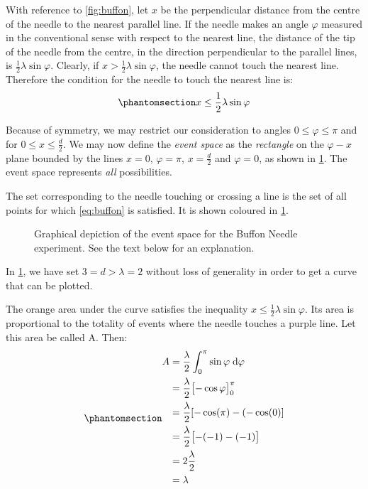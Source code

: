 \documentclass[
  a4paper,
]{article}
\begin{document}
With reference to \cref{fig:buffon}, let \(x\) be the perpendicular
distance from the centre of the needle to the nearest parallel line. If
the needle makes an angle \(\varphi\) measured in the conventional sense
with respect to the nearest line, the distance of the tip of the needle
from the centre, in the direction perpendicular to the parallel lines,
is \(\frac{1}{2}\lambda\sin\varphi\). Clearly, if
\(x > \frac{1}{2}\lambda\sin\varphi\), the needle cannot touch the
nearest line. Therefore the condition for the needle to touch the
nearest line is: \begin{equation}\phantomsection\label{eq:buffon}{
x \leq \frac{1}{2}\lambda\sin\varphi
}\end{equation}

Because of symmetry, we may restrict our consideration to angles
\(0 \leq \varphi \leq \pi\) and for \(0 \leq x \leq \frac{d}{2}\). We
may now define the \emph{event space} as the \emph{rectangle} on the
\(\varphi-x\) plane bounded by the lines \(x=0\), \(\varphi = \pi\),
\(x = \frac{d}{2}\) and \(\varphi = 0\), as shown in \cref{fig:plot}.
The event space represents \emph{all} possibilities.

The set corresponding to the needle touching or crossing a line is the
set of all points for which \cref{eq:buffon} is satisfied. It is shown
coloured in \cref{fig:plot}.

\begin{figure}
\centering

\caption{Graphical depiction of the event space for the Buffon Needle
experiment. See the text below for an explanation.}\label{fig:plot}
\end{figure}

In \cref{fig:plot}, we have set \(3 = d > \lambda = 2\) without loss of
generality in order to get a curve that can be plotted.

The orange area under the curve satisfies the inequality
\(x \leq \frac{1}{2}\lambda\sin\varphi\). Its area is proportional to
the totality of events where the needle touches a purple line. Let this
area be called A. Then:
\begin{equation}\phantomsection\label{eq:successes}{
\begin{aligned}
A &= \frac{\lambda}{2}\int_0^{\pi}\sin\varphi\;\mathrm{d}\varphi\\
&= \frac{\lambda}{2}\displaystyle\bigl[-\cos\varphi\bigr]_0^{\pi}\\
&= \frac{\lambda}{2}[-\cos(\pi) - (-\cos(0)]\\
&= \frac{\lambda}{2}\displaystyle\bigl[-(-1) -(-1)\bigr]\\
&= 2\frac{\lambda}{2}\\
&= \lambda
\end{aligned}
}\end{equation}
\end{document}
